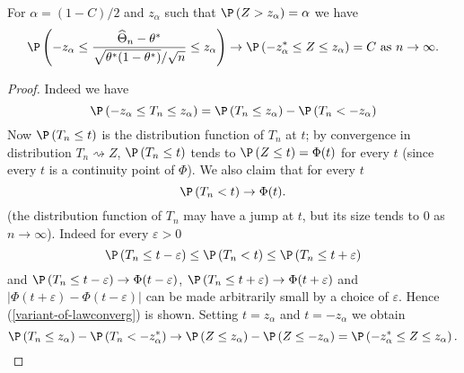 \begin{lemma}
\label{lem-lawconv-interval}For $\alpha =\left( 1-C\right) /2$ and $%
z_{\alpha}$ such that $\P \left( Z>z_{\alpha}\right)
=\alpha $ we have 
\begin{equation*}
\P \left( -z_{\alpha}\leq \frac{\widehat{\Theta}_{n}-\theta^*}{\sqrt{\theta^*(1-\theta^*)}/\sqrt{%
n}}\leq z_{\alpha}\right) \rightarrow \P \left( -z_{\alpha }^{\ast
}\leq Z\leq z_{\alpha}\right) =C\text{ as }n\rightarrow \infty .
\end{equation*}
\end{lemma}

\begin{proof}
Indeed we have 
\begin{equation*}
\P \left( -z_{\alpha}\leq T_{n}\leq z_{\alpha}\right)
=\P \left( T_{n}\leq z_{\alpha}\right) -\P \left(
T_{n}<-z_{\alpha}\right)
\end{equation*}%
Now $\P \left( T_{n}\leq t\right) $ is the distribution function of $T_{n}$
at $t$; by convergence in distribution $T_{n}\rightsquigarrow Z$, $\P \left( T_{n}\leq t\right) $ tends to 
$\P \left( Z\leq t\right) =\Phi (t)$ for every $t$ (since every $t$ is a
continuity point of $\Phi$). We also claim that for every $t$ 
\begin{equation}
\P \left( T_{n}<t\right) \rightarrow \Phi (t).
\label{variant-of-lawconverg}
\end{equation}%
(the distribution function of $T_{n}$ may have a jump at $t$, but its size
tends to $0$ as $n \to \infty$). Indeed for every $\varepsilon >0$ 
\begin{equation*}
\P \left( T_{n}\leq t-\varepsilon \right) \leq \P \left( T_{n}<t\right)
\leq \P \left( T_{n}\leq t+\varepsilon \right)
\end{equation*}%
and $\P \left( T_{n}\leq t-\varepsilon \right) \rightarrow \Phi
(t-\varepsilon )$, $\P \left( T_{n}\leq t+\varepsilon \right) \rightarrow
\Phi (t+\varepsilon )$ and $\left\vert \Phi (t+\varepsilon )-\Phi
(t-\varepsilon )\right\vert $ can be made arbitrarily small by a choice of $%
\varepsilon $. Hence (\ref{variant-of-lawconverg}) is shown. Setting $%
t=z_{\alpha}$ and $t=-z_{\alpha}$ we obtain 
\begin{equation*}
\P \left( T_{n}\leq z_{\alpha}\right) -\P \left( T_{n}<-z_{\alpha
}^{\ast }\right) \rightarrow \P \left( Z\leq z_{\alpha}\right)
-\P \left( Z\leq -z_{\alpha}\right) =\P \left( -z_{\alpha }^{\ast
}\leq Z\leq z_{\alpha}\right) .
\end{equation*}
\end{proof}

